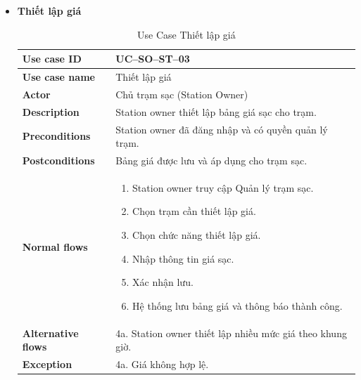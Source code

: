 \begin{enumerate}[label=\textbf{\alph*)}]
\begin{itemize}
  \item \textbf{Thiết lập giá}
    \begin{center}
      \renewcommand{\arraystretch}{1.5}
      \begin{longtable}{|m{}|m{}|}
          \caption{Use Case Thiết lập giá}
        \label{tab:uc_so_st_03} \\
        \hline
        \textbf{Use case ID} & UC--SO--ST--03 \\
        \hline
        \textbf{Use case name} & Thiết lập giá \\
        \hline
        \textbf{Actor} & Chủ trạm sạc (Station Owner) \\
        \hline
        \textbf{Description} & Station owner thiết lập bảng giá sạc cho trạm. \\
        \hline
        \textbf{Preconditions} &
        Station owner đã đăng nhập và có quyền quản lý trạm.\\
        \hline
        \textbf{Postconditions} &
        Bảng giá được lưu và áp dụng cho trạm sạc.\\
        \hline
        \textbf{Normal flows} &
        \begin{enumerate}[label=\arabic*.]
          \item Station owner truy cập Quản lý trạm sạc.
          \item Chọn trạm cần thiết lập giá.
          \item Chọn chức năng thiết lập giá.
          \item Nhập thông tin giá sạc.
          \item Xác nhận lưu.
          \item Hệ thống lưu bảng giá và thông báo thành công.
        \end{enumerate}\\
        \hline
        \textbf{Alternative flows} &
        4a. Station owner thiết lập nhiều mức giá theo khung giờ.\\
        \hline
        \textbf{Exception} &
        4a. Giá không hợp lệ.\\
        \hline
        \end{longtable}
    \end{center}


\end{itemize}
\end{enumerate}
